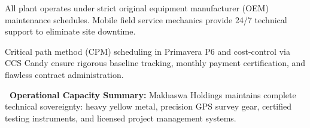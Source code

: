 \vspace{0.18cm}

\noindent
\begin{minipage}[t]{0.485\textwidth}
    \begin{tcolorbox}[enhanced, colback=white, colframe=mhlightgray, boxrule=0.8pt, arc=4pt, title={\bfseries\color{white}\faShieldAlt\ Preventive Maintenance Governance}, colbacktitle=mhnavy, left=8pt, right=8pt, top=7pt, bottom=7pt, drop shadow=black!4]
        {\fontsize{8.1pt}{11.3pt}\selectfont\color{mhtext}
        All plant operates under strict original equipment manufacturer (OEM) maintenance schedules. Mobile field service mechanics provide 24/7 technical support to eliminate site downtime.
        }
    \end{tcolorbox}
\end{minipage}
\hfill
\begin{minipage}[t]{0.485\textwidth}
    \begin{tcolorbox}[enhanced, colback=white, colframe=mhlightgray, boxrule=0.8pt, arc=4pt, title={\bfseries\color{white}\faProjectDiagram\ EPCM Project Management Governance}, colbacktitle=mhblue, left=8pt, right=8pt, top=7pt, bottom=7pt, drop shadow=black!4]
        {\fontsize{8.1pt}{11.3pt}\selectfont\color{mhtext}
        Critical path method (CPM) scheduling in Primavera P6 and cost-control via CCS Candy ensure rigorous baseline tracking, monthly payment certification, and flawless contract administration.
        }
    \end{tcolorbox}
\end{minipage}

\vfill

\noindent
\begin{tcolorbox}[enhanced, colback=white, colframe=mhnavy, boxrule=0.8pt, arc=3pt, left=8pt, right=8pt, top=6pt, bottom=6pt, drop shadow=black!3]
    {\fontsize{8pt}{10.6pt}\selectfont\color{mhnavy}\bfseries\faCheckCircle\ Operational Capacity Summary:}\quad
    {\fontsize{8pt}{10.6pt}\selectfont\color{mhtext}
    Makhaswa Holdings maintains complete technical sovereignty: heavy yellow metal, precision GPS survey gear, certified testing instruments, and licensed project management systems.
    }
\end{tcolorbox}

\clearpage
